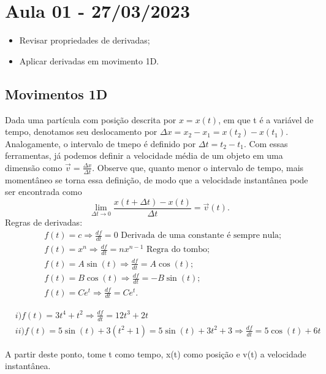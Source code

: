 \documentclass[PhysicsI/physics_notes.tex]{subfiles}
\begin{document}
\section{Aula 01 - 27/03/2023}
\begin{itemize}
	\item Revisar propriedades de derivadas;
	\item Aplicar derivadas em movimento 1D.
\end{itemize}
\subsection{Movimentos 1D}
Dada uma partícula com posição descrita por $x = x(t)$, em que t é a variável de tempo, denotamos seu deslocamento
por $\Delta x = x_{2} - x_{1} = x(t_{2}) - x(t_{1}).$ Analogamente, o intervalo de tmepo é definido por $\Delta t = t_{2} - t_{1}$.
Com essas ferramentas, já podemos definir a velocidade média de um objeto em uma dimensão como $\vec{v} = \frac{\Delta x}{\Delta t}.$
Observe que, quanto menor o intervalo de tempo, mais momentâneo se torna essa definição, de modo que a velocidade instantânea
pode ser encontrada como
$$
	\lim_{\Delta t\to0}\frac{x(t + \Delta t) - x(t)}{\Delta t} = \vec{v}(t).
$$
Regras de derivadas:
\begin{align*}
	 & f(t) = c \Rightarrow \frac{df}{dt} = 0 \text{ Derivada de uma constante é sempre nula;} \\
	 & f(t) = x^{n} \Rightarrow \frac{df}{dt} = nx^{n-1} \text{ Regra do tombo;}               \\
	 & f(t) = A\sin{(t)} \Rightarrow \frac{df}{dt} = A\cos{(t)};                               \\
	 & f(t) = B\cos{(t)} \Rightarrow \frac{df}{dt} = -B\sin{(t)};                              \\
	 & f(t) = C e^{t} \Rightarrow \frac{df}{dt} = C e^{t}.
\end{align*}
\begin{example}
	\begin{align*}
		 & i)f(t) = 3t^{4} + t^{2} \Rightarrow \frac{df}{dt} = 12t^{3} + 2t                                         \\
		 & ii) f(t) = 5\sin{(t)} + 3(t^{2}+1) = 5\sin{(t)} + 3t^{2} + 3 \Rightarrow \frac{df}{dt} = 5\cos{(t)} + 6t
	\end{align*}
\end{example}

A partir deste ponto, tome t como tempo, x(t) como posição e v(t) a velocidade instantânea.
\end{document}
